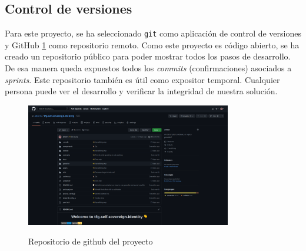 \subsection{Control de versiones}
Para este proyecto, se ha seleccionado \verb|git| como aplicación de control de versiones y GitHub \ref{fg:github} como repositorio remoto. Como este proyecto es código abierto, se ha creado un repositorio público para poder mostrar todos los pasos de desarrollo. De esa manera queda expuestos todos los \textit{commits} (confirmaciones) asociados a \textit{sprints}. Este repositorio también es útil como expositor temporal. Cualquier persona puede ver el desarrollo y verificar la integridad de nuestra solución.
\begin{figure}[h!]
    \centering
    \includegraphics[width=0.8\textwidth]{Figures/github.png}
    \caption{Repositorio de github del proyecto}
    \label{fg:github}
    \cite{web:repo}
\end{figure}
